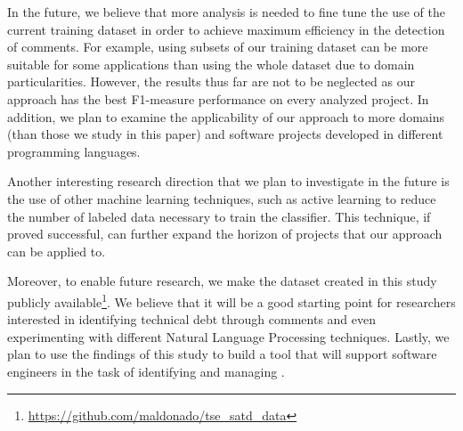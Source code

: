In the future, we believe that more analysis is needed to fine tune the use of the current training dataset in order to achieve maximum efficiency in the detection of \SATD comments. For example, using subsets of our training dataset can be more suitable for some applications than using the whole dataset due to domain particularities. However, the results thus far are not to be neglected as our approach has the best F1-measure performance on every analyzed project. In addition, we plan to examine the applicability of our approach to more domains (than those we study in this paper) and software projects developed in different programming languages.

Another interesting research direction that we plan to investigate in the future is the use of other machine learning techniques, such as active learning to reduce the number of labeled data necessary to train the classifier. This technique, if proved successful, can further expand the horizon of projects that our approach can be applied to.

Moreover, to enable future research, we make the dataset created in this study publicly available\footnote{\url{https://github.com/maldonado/tse_satd_data}}. We believe that it will be a good starting point for researchers interested in identifying technical debt through comments and even experimenting with different Natural Language Processing techniques. Lastly, we plan to use the findings of this study to build a tool that will support software engineers in the task of identifying and managing \SATD. 
